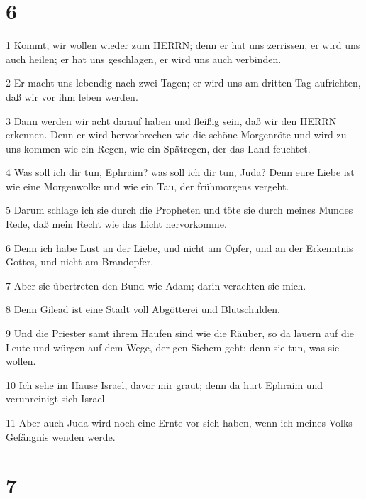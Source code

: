 \chapter{6}

\par 1 Kommt, wir wollen wieder zum HERRN; denn er hat uns zerrissen, er wird uns auch heilen; er hat uns geschlagen, er wird uns auch verbinden.
\par 2 Er macht uns lebendig nach zwei Tagen; er wird uns am dritten Tag aufrichten, daß wir vor ihm leben werden.
\par 3 Dann werden wir acht darauf haben und fleißig sein, daß wir den HERRN erkennen. Denn er wird hervorbrechen wie die schöne Morgenröte und wird zu uns kommen wie ein Regen, wie ein Spätregen, der das Land feuchtet.
\par 4 Was soll ich dir tun, Ephraim? was soll ich dir tun, Juda? Denn eure Liebe ist wie eine Morgenwolke und wie ein Tau, der frühmorgens vergeht.
\par 5 Darum schlage ich sie durch die Propheten und töte sie durch meines Mundes Rede, daß mein Recht wie das Licht hervorkomme.
\par 6 Denn ich habe Lust an der Liebe, und nicht am Opfer, und an der Erkenntnis Gottes, und nicht am Brandopfer.
\par 7 Aber sie übertreten den Bund wie Adam; darin verachten sie mich.
\par 8 Denn Gilead ist eine Stadt voll Abgötterei und Blutschulden.
\par 9 Und die Priester samt ihrem Haufen sind wie die Räuber, so da lauern auf die Leute und würgen auf dem Wege, der gen Sichem geht; denn sie tun, was sie wollen.
\par 10 Ich sehe im Hause Israel, davor mir graut; denn da hurt Ephraim und verunreinigt sich Israel.
\par 11 Aber auch Juda wird noch eine Ernte vor sich haben, wenn ich meines Volks Gefängnis wenden werde.

\chapter{7}

